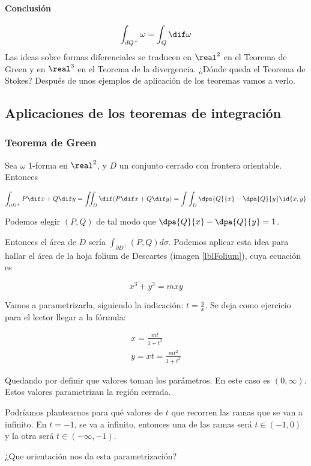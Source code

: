 \paragraph{Conclusión}
\[\int_{dQ^+} \omega = \int_{Q}\dif \omega\]
Las ideas sobre formas diferenciales se traducen en $\real^2$ en el Teorema de Green y en $\real^3$ en el Teorema de la divergencia. ¿Dónde queda el Teorema de Stokes? Después de unos ejemplos de aplicación de los teoremas vamos a verlo.

\subsection{Aplicaciones de los teoremas de integración}
\subsubsection{Teorema de Green}
Sea $\omega$ 1-forma en $\real^2$, y $D$ un conjunto cerrado con frontera orientable. Entonces

\[
\int_{\partial  D^+} P\dif x+Q\dif y = \iint_D \dif(P\dif x+Q\dif y) = \int\int_D \dpa{Q}{x} - \dpa{Q}{y}\id{x,y}
\]

\obs Podemos elegir $(P,Q)$ de tal modo que $\displaystyle \dpa{Q}{x}-\dpa{Q}{y} = 1$.

Entonces el área de $D$ sería $\displaystyle\int_{\partial  D^+} (P,Q)d\sigma$. Podemos aplicar esta idea para hallar el área de la hoja folium de Descartes (imagen \ref{lblFolium}), cuya ecuación es

\[x^3+y^3 = mxy\]


Vamos a parametrizarla, siguiendo la indicación: $t = \frac{y}{x}$. Se deja como ejercicio para el lector llegar a la fórmula:

\begin{gather*}
x=\frac{mt}{1+t^3}\\
y= xt = \frac{mt^2}{1+t^3}
\end{gather*}

Quedando por definir que valores toman los parámetros. En este caso es $(0,\infty)$. Estos valores parametrizan la región cerrada.

Podríamos plantearnos para qué valores de $t$ que recorren las ramas que se van a infinito. En $t=-1$, se va a infinito, entonces una de las ramas será $t\in(-1,0)$ y la otra será $t\in(-\infty,-1)$.

¿Que orientación nos da esta parametrización?

